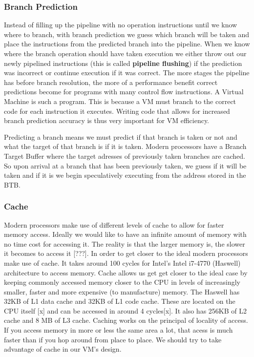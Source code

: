 \documentclass[english,a4paper]{article}
\begin{document}
\subsubsection{Branch Prediction}

Instead of filling up the pipeline with no operation instructions
until we know where to branch, with branch prediction we guess which
branch will be taken and place the instructions from the predicted
branch into the pipeline. When we know where the branch operation
should have taken execution we either throw out our newly pipelined
instructions (this is called \textbf{pipeline flushing}) if the
prediction was incorrect or continue execution if it was correct. The
more stages the pipeline has before branch resolution, the more of a
performance benefit correct predictions become for programs with many
control flow instructions. A Virtual Machine is such a program. This
is because a VM must branch to the correct code for each instruction
it executes. Writing code that allows for increased branch prediction
accuracy is thus very important for VM efficiency.

Predicting a branch means we must predict if that branch is taken or
not and what the target of that branch is if it is taken. Modern
processors have a Branch Target Buffer where the target adresses of
previously taken branches are cached. So upon arrival at a branch that
has been previously taken, we guess if it will be taken and if it is
we begin speculatively executing from the address stored in the BTB.

\subsubsection{Cache}

Modern processors make use of different levels of cache to allow for
faster memory access. Ideally we would like to have an infinite amount
of memory with no time cost for accessing it. The reality is that the
larger memory is, the slower it becomes to access it {[}???{]}. In
order to get closer to the ideal modern processors make use of
cache. It takes around 100 cycles for Intel's Intel i7-4770 (Haswell)
architecture to access memory. Cache allows us get get closer to the
ideal case by keeping commonly accessed memory closer to the CPU in
levels of increasingly smaller, faster and more expensive (to
manufacture) memory. The Haswell has 32KB of L1 data cache and 32KB of
L1 code cache. These are located on the CPU itself {[}x{]} and can be
accessed in around 4 cycles{[}x{]}. It also has 256KB of L2 cache and
8 MB of L3 cache. Caching works on the principal of locality of
access. If you access memory in more or less the same area a lot, that
acess is much faster than if you hop around from place to place. We
should try to take advantage of cache in our VM's design.
\end{document}
